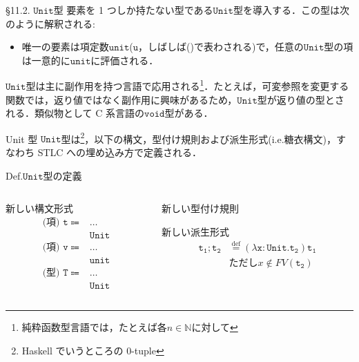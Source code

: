 \documentclass[9pt]{beamer}
\begin{document}
\begin{frame}{\S11.2. $\mathtt{Unit}$型}
    要素を 1 つしか持たない型である$\mathtt{Unit}$型を導入する．この型は次のように解釈される:\begin{itemize}
    \item 唯一の要素は項定数$\mathtt{unit}$($\mathtt{u}$，しばしば()で表わされる)で，任意の$\mathtt{Unit}$型の項は一意的に$\mathtt{unit}$に評価される．
    \end{itemize}
    $\mathtt{Unit}$型は主に副作用を持つ言語で応用される\footnote{純粋函数型言語では，たとえば各$n\in\mathbb{N}$に対して}．たとえば，可変参照を変更する関数では，返り値ではなく副作用に興味があるため，$\mathtt{Unit}$型が返り値の型とされる．類似物として C 系言語の$\mathtt{void}$型がある．
    \end{frame}
\begin{frame}{Unit 型}
$\mathtt{Unit}$型は\footnote{Haskell でいうところの 0-tuple}，以下の構文，型付け規則および派生形式(i.e.糖衣構文)，すなわち STLC への埋め込み方で定義される．
\begin{dblock}{Def.$\mathtt{Unit}$型の定義}
	\begin{columns}
		\begin{column}{0.30\textwidth}
			新しい構文形式
			\begin{align*}
			\mathtt{\text{(項)\ }t}\Coloneq&\ldots\\
                                        &\mathtt{Unit}
			\end{align*}
        \begin{align*}
                \mathtt{\text{(項)\ }v}\Coloneq&\ldots\\
                &\mathtt{unit}
            \end{align*}
            \begin{align*}
                \mathtt{\text{(型)\ }T}\Coloneq&\ldots\\
                &\mathtt{Unit}
            \end{align*}
		\end{column}\begin{column}{0.66\textwidth}
			新しい型付け規則\begin{prooftree}
			\end{prooftree}
            新しい派生形式
            \begin{align*}
                \mathtt{t_{1};t_{2}}&\stackrel{\text{def}}{=}(\lambda \mathtt{x:Unit. t_{2}})\mathtt{t_{1}}\\
                    &\text{ただし}x\notin FV(\mathtt{t_{2}})
            \end{align*}
		\end{column}
	\end{columns}\end{dblock}
\end{frame}
\end{document}
